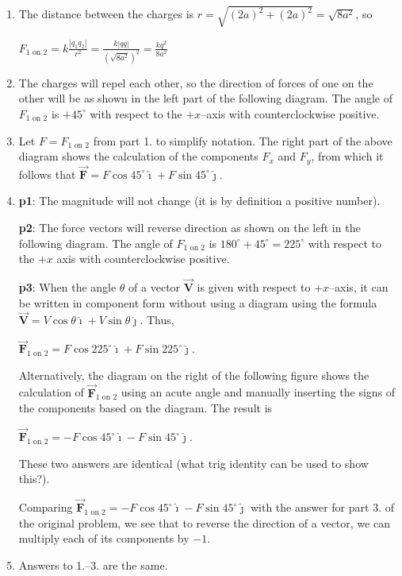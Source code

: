 \documentclass{article}
\renewcommand{\mbox}{\text}
\newcommand{\ihat}[0]{\hat{\boldsymbol{\imath}}}
\newcommand{\jhat}[0]{\hat{\boldsymbol{\jmath}}}
\newcommand{\bfvec}[1]{\vec{\mathbf{#1}}}
\begin{document}
\begin{enumerate}

  \item The distance between the charges is $r=\sqrt{(2a)^2+(2a)^2}=\sqrt{8a^2}$, so

        $F_{1\mbox{ on } 2}=k\frac{|q_1q_2|}{r^2}=\frac{k|qq|}{(\sqrt{8a^2})^2}=\frac{kq^2}{8a^2}$

  \item The charges will repel each other, so the direction of forces of one on the other will be as shown in the left part of the following diagram. The angle of $F_{1\mbox{ on } 2}$ is $+45^\circ$ with respect to the $+x$--axis with counterclockwise positive.

        

  \item Let $F = F_{1\mbox{ on } 2}$ from part 1. to simplify notation. The right part of the above diagram shows the calculation of the components $F_x$ and $F_y$, from which it follows that $\bfvec{F} = F\cos 45^\circ \ihat + F\sin 45^\circ \jhat$.

  \item 

        \textbf{p1}: The magnitude will not change (it is by definition a positive number).

        \textbf{p2}: The force vectors will reverse direction as shown on the left in the following diagram. The angle of $F_{1\mbox{ on } 2}$ is $180^\circ+45^\circ=225^\circ$ with respect to the $+x$ axis with counterclockwise positive.

        \textbf{p3}: When the angle $\theta$ of a vector $\bfvec{V}$ is given with respect to $+x$--axis, it can be written in component form without using a diagram using the formula $\bfvec{V} = V\cos\theta\ihat + V\sin\theta\jhat$. Thus,

        $\bfvec{F}_{1\mbox{ on } 2} = F\cos 225^\circ \ihat + F\sin 225^\circ \jhat$.

        Alternatively, the diagram on the right of the following figure shows the calculation of $\bfvec{F}_{1\mbox{ on } 2}$ using an acute angle and manually inserting the signs of the components based on the diagram. The result is

        $\bfvec{F}_{1\mbox{ on } 2} = -F\cos 45^\circ \ihat - F\sin 45^\circ \jhat$.

        These two answers are identical (what trig identity can be used to show this?).

        Comparing $\bfvec{F}_{1\mbox{ on } 2} = -F\cos 45^\circ \ihat - F\sin 45^\circ \jhat$ with the answer for part 3. of the original problem, we see that to reverse the direction of a vector, we can multiply each of its components by $-1$.

        

  \item Answers to 1.--3. are the same.

\end{enumerate}
\end{document}
